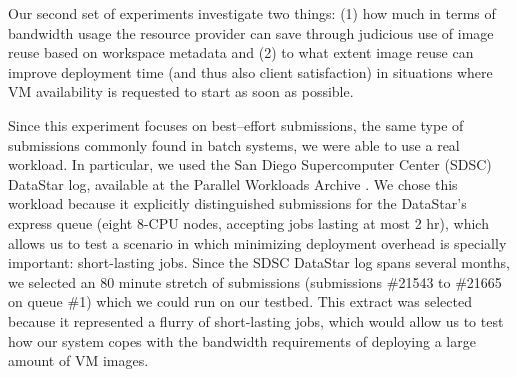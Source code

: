 Our second set of experiments investigate two things: (1) how much in
terms of bandwidth usage the resource provider can save through
judicious use of image reuse based on workspace metadata and (2) to
what extent image reuse can improve deployment time (and thus also
client satisfaction) in situations where VM availability is requested
to start as soon as possible.

Since this experiment focuses on best--effort submissions, the same type of
submissions commonly found in batch systems, we were able to use a real
workload. In particular, we used the San Diego Supercomputer Center
(SDSC) DataStar log, available at the Parallel Workloads Archive \cite{BorjaCite21}.
We chose this workload because it explicitly distinguished submissions
for the DataStar's express queue (eight 8{}-CPU nodes, accepting jobs
lasting at most 2 hr), which allows us to test a scenario in which
minimizing deployment overhead is specially important: short{}-lasting
jobs. Since the SDSC DataStar log spans several months, we selected an
80 minute stretch of submissions (submissions \#21543 to \#21665 on
queue \#1) which we could run on our testbed. This extract was selected
because it represented a flurry of short{}-lasting jobs, which would
allow us to test how our system copes with the bandwidth requirements
of deploying a large amount of VM images.


